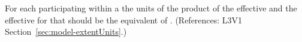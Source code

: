 For each \Species participating within a \Reaction the units of
the product of the effective  and the effective 
 for that \Species should be the 
equivalent of .
(References: L3V1 Section~\ref{sec:model-extentUnits}.)
